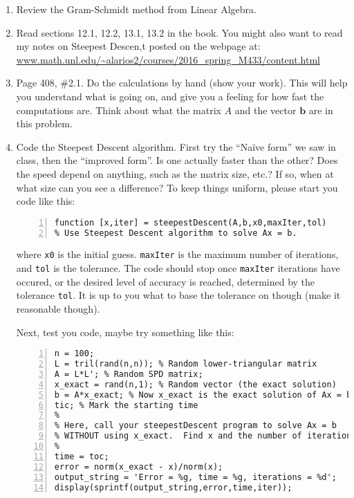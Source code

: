 \documentclass[12pt]{article}
\theoremstyle{plain}
\theoremstyle{definition}
\theoremstyle{remark}
\numberwithin{equation}{section} %
\numberwithin{figure}{section}   %
\begin{document}
\begin{enumerate}
\item Review the Gram-Schmidt method from Linear Algebra.
\item Read sections 12.1, 12.2, 13.1, 13.2 in the book.  You might also want to read my notes on Steepest Descen,t posted on the webpage at:\\ \url{www.math.unl.edu/~alarios2/courses/2016_spring_M433/content.html}
\item Page 408, \#2.1.  Do the calculations by hand (show your work).  This will help you understand what is going on, and give you a feeling for how fast the computations are.  Think about what the matrix $A$ and the vector $\mathbf{b}$ are in this problem.
\item Code the Steepest Descent algorithm.  First try the ``Na\"ive form'' we saw in class, then the ``improved form''.  Is one actually faster than the other?  Does the speed depend on anything, such as the matrix size, etc.?  If so, when at what size can you see a difference?  To keep things uniform, please start you code like this:


\begin{minipage}[h]{5in}
\centering
\begin{lstlisting}[numbers=left,firstnumber=1]
function [x,iter] = steepestDescent(A,b,x0,maxIter,tol)
% Use Steepest Descent algorithm to solve Ax = b.
\end{lstlisting}
\end{minipage}

where \texttt{x0} is the initial guess.  \texttt{maxIter} is the maximum number of iterations, and \texttt{tol} is the tolerance.  The code should stop once \texttt{maxIter} iterations have occured, or the desired level of accuracy is reached, determined by the tolerance \texttt{tol}. It is up to you what to base the tolerance on though (make it reasonable though).  

\pagebreak

\thispagestyle{empty}

Next, test you code, maybe try something like this:

\begin{minipage}[h]{5in}
\centering
\begin{lstlisting}[numbers=left,firstnumber=1]
% A program to test linear solvers.
n = 100;
L = tril(rand(n,n)); % Random lower-triangular matrix
A = L*L'; % Random SPD matrix;
x_exact = rand(n,1); % Random vector (the exact solution)
b = A*x_exact; % Now x_exact is the exact solution of Ax = b.
tic; % Mark the starting time
%
% Here, call your steepestDescent program to solve Ax = b 
% WITHOUT using x_exact.  Find x and the number of iterations.
%
time = toc;
error = norm(x_exact - x)/norm(x);
output_string = 'Error = %g, time = %g, iterations = %d';
display(sprintf(output_string,error,time,iter));
\end{lstlisting}
\end{minipage}


\end{enumerate}
\end{document}
